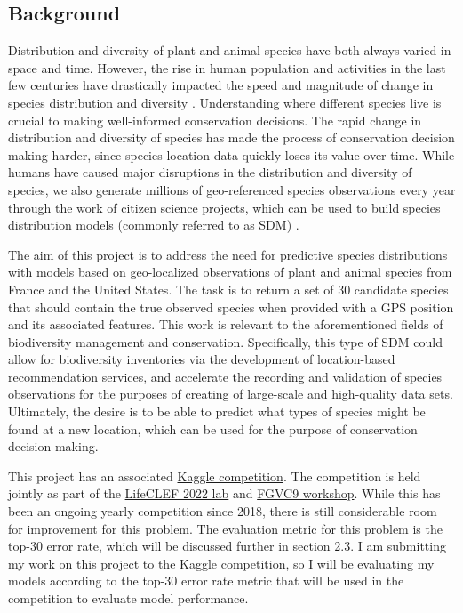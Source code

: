 \documentclass[12pt, oneside]{article}
\begin{document}
\begin{normalsize}

\subsection{Background}

Distribution and diversity of plant and animal species have both always varied in space and time. However, the rise in human population and activities in the last few centuries have drastically impacted the speed and magnitude of change in species distribution and diversity \cite{pinto2021predicting}. Understanding where different species live is crucial to making well-informed conservation decisions. The rapid change in distribution and diversity of species has made the process of conservation decision making harder, since species location data quickly loses its value over time. While humans have caused major disruptions in the distribution and diversity of species, we also generate millions of geo-referenced species observations every year through the work of citizen science projects, which can be used to build species distribution models (commonly referred to as SDM) \cite{lorieul2021overview}.

	The aim of this project is to address the need for predictive species distributions with models based on geo-localized observations of plant and animal species from France and the United States. The task is to return a set of 30 candidate species that should contain the true observed species when provided with a GPS position and its associated features. This work is relevant to the aforementioned fields of biodiversity management and conservation. Specifically, this type of SDM could allow for biodiversity inventories via the development of location-based recommendation services, and accelerate the recording and validation of species observations for the purposes of creating of large-scale and high-quality data sets. Ultimately, the desire is to be able to predict what types of species might be found at a new location, which can be used for the purpose of conservation decision-making.

This project has an associated \href{https://www.kaggle.com/c/geolifeclef-2022-lifeclef-2022-fgvc9/overview}{Kaggle competition}. The competition is held jointly as part of the \href{https://www.imageclef.org/LifeCLEF2022}{LifeCLEF 2022 lab} and \href{https://sites.google.com/view/fgvc9}{FGVC9 workshop}. While this has been an ongoing yearly competition since 2018, there is still considerable room for improvement for this problem. The evaluation metric for this problem is the top-30 error rate, which will be discussed further in section 2.3. I am submitting my work on this project to the Kaggle competition, so I will be evaluating my models according to the top-30 error rate metric that will be used in the competition to evaluate model performance.


\end{normalsize}
\end{document}
